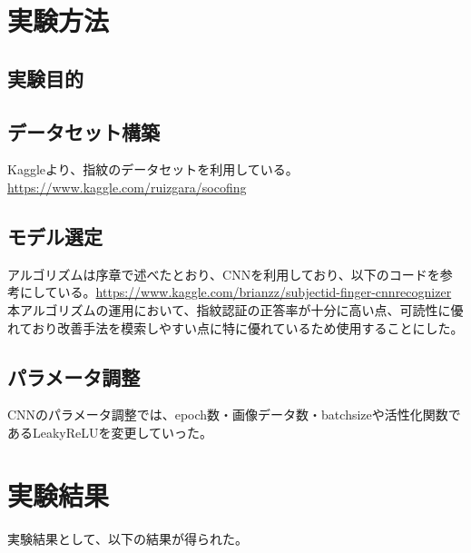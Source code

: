 \documentclass[a4paper, 11pt, titlepage]{jsarticle}
\begin{document}
\section{実験方法}


\subsection{実験目的}



\subsection{データセット構築}
Kaggleより、指紋のデータセットを利用している。\url{https://www.kaggle.com/ruizgara/socofing}

\subsection{モデル選定}
アルゴリズムは序章で述べたとおり、CNNを利用しており、以下のコードを参考にしている。\url{https://www.kaggle.com/brianzz/subjectid-finger-cnnrecognizer}\\
本アルゴリズムの運用において、指紋認証の正答率が十分に高い点、可読性に優れており改善手法を模索しやすい点に特に優れているため使用することにした。

\subsection{パラメータ調整}
CNNのパラメータ調整では、epoch数・画像データ数・batchsizeや活性化関数であるLeakyReLUを変更していった。


\section{実験結果}

実験結果として、以下の結果が得られた。%
\end{document}
